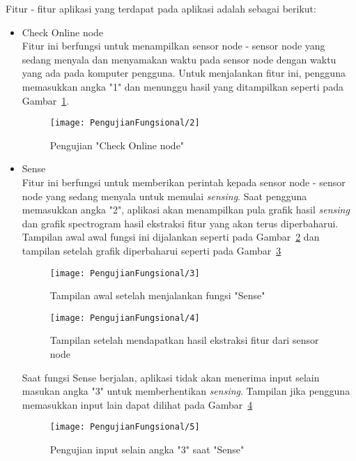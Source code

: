 Fitur - fitur aplikasi yang terdapat pada aplikasi adalah sebagai berikut:
\begin{itemize}
\item Check Online node \\
Fitur ini berfungsi untuk menampilkan sensor node - sensor node yang sedang menyala dan menyamakan waktu pada sensor node dengan waktu yang ada
pada komputer pengguna. Untuk menjalankan fitur ini, pengguna memasukkan angka "1" dan menunggu hasil yang ditampilkan seperti pada Gambar~\ref{fig:PengujianFungsional2}.

\begin{figure}[H]
	\centering
	\texttt{[image: PengujianFungsional/2]}  
	\caption[Pengujian "Check Online node" ]{Pengujian "Check Online node"} 
	\label{fig:PengujianFungsional2} 
\end{figure}

\item Sense \\
Fitur ini berfungsi untuk memberikan perintah kepada sensor node - sensor node yang sedang menyala untuk memulai {\it sensing}. Saat pengguna memasukkan angka "2", aplikasi akan menampilkan pula grafik hasil {\it sensing} dan grafik spectrogram hasil ekstraksi fitur yang akan terus diperbaharui. Tampilan awal awal fungsi ini dijalankan seperti pada   
Gambar~\ref{fig:PengujianFungsional3} dan tampilan setelah grafik diperbaharui seperti pada Gambar~\ref{fig:PengujianFungsional4}
\begin{figure}[H]
	\centering
	\texttt{[image: PengujianFungsional/3]}  
	\caption[Tampilan awal setelah menjalankan fungsi "Sense" ]{Tampilan awal setelah menjalankan fungsi "Sense"} 
	\label{fig:PengujianFungsional3} 
\end{figure}

\begin{figure}[H]
	\centering
	\texttt{[image: PengujianFungsional/4]}  
	\caption[Tampilan setelah mendapatkan hasil ekstraksi fitur dari sensor node]{Tampilan setelah mendapatkan hasil ekstraksi fitur dari sensor node} 
	\label{fig:PengujianFungsional4} 
\end{figure}

Saat fungsi Sense berjalan, aplikasi tidak akan menerima input selain masukan angka "3" untuk memberhentikan {\it sensing}. Tampilan jika pengguna memasukkan 
input lain dapat dilihat pada Gambar~\ref{fig:PengujianFungsional5}
\begin{figure}[H]
	\centering
	\texttt{[image: PengujianFungsional/5]}  
	\caption[Pengujian input selain angka "3" "Sense" ]{Pengujian input selain angka "3" saat "Sense"} 
	\label{fig:PengujianFungsional5} 
\end{figure}


\end{itemize}
